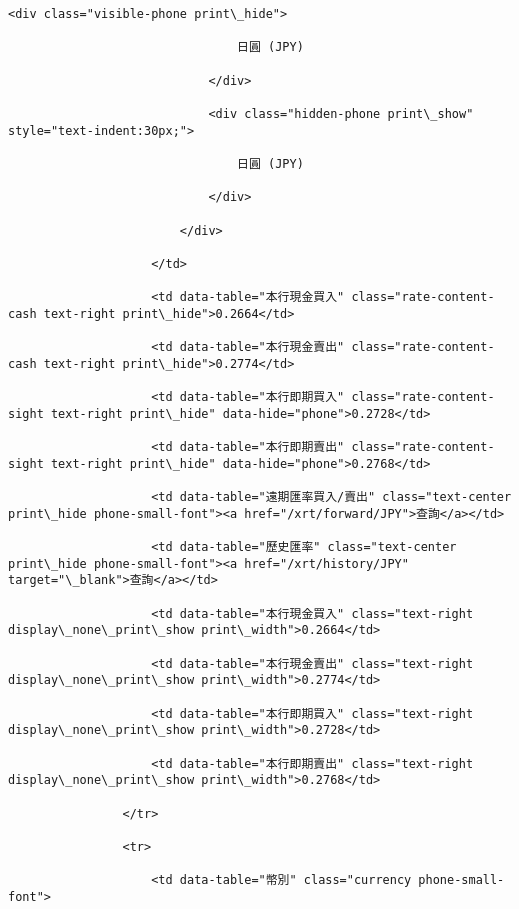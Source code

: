 \documentclass[11pt]{article}
\begin{document}
\begin{Verbatim}[commandchars=\\\{\}]
                            <div class="visible-phone print\_hide">

                                日圓 (JPY)

                            </div>

                            <div class="hidden-phone print\_show" style="text-indent:30px;">

                                日圓 (JPY)

                            </div>

                        </div>

                    </td>

                    <td data-table="本行現金買入" class="rate-content-cash text-right print\_hide">0.2664</td>

                    <td data-table="本行現金賣出" class="rate-content-cash text-right print\_hide">0.2774</td>

                    <td data-table="本行即期買入" class="rate-content-sight text-right print\_hide" data-hide="phone">0.2728</td>

                    <td data-table="本行即期賣出" class="rate-content-sight text-right print\_hide" data-hide="phone">0.2768</td>

                    <td data-table="遠期匯率買入/賣出" class="text-center print\_hide phone-small-font"><a href="/xrt/forward/JPY">查詢</a></td>

                    <td data-table="歷史匯率" class="text-center print\_hide phone-small-font"><a href="/xrt/history/JPY" target="\_blank">查詢</a></td>

                    <td data-table="本行現金買入" class="text-right display\_none\_print\_show print\_width">0.2664</td>

                    <td data-table="本行現金賣出" class="text-right display\_none\_print\_show print\_width">0.2774</td>

                    <td data-table="本行即期買入" class="text-right display\_none\_print\_show print\_width">0.2728</td>

                    <td data-table="本行即期賣出" class="text-right display\_none\_print\_show print\_width">0.2768</td>

                </tr>

                <tr>

                    <td data-table="幣別" class="currency phone-small-font">


\end{Verbatim}
\end{document}
